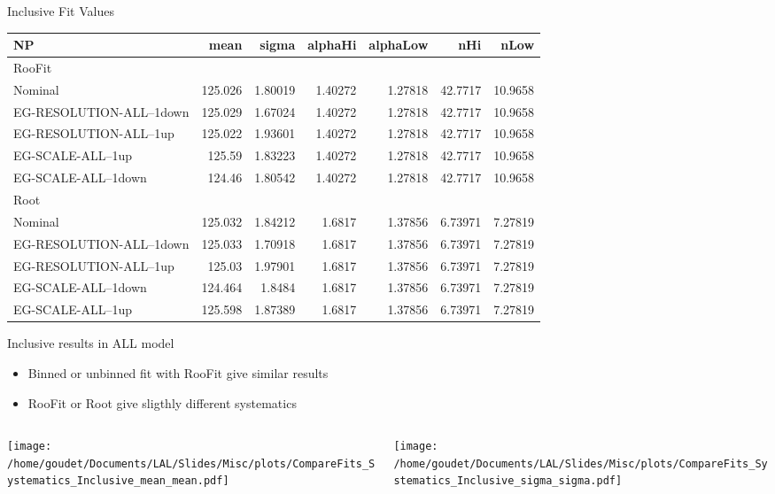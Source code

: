 \documentclass[bigger]{beamer}
\begin{document}
\begin{frame}[label={sec:org164a9b8}]{Inclusive Fit Values}
\begin{center}
\tiny
\begin{tabular}{lrrrrrr}
\hline
NP & mean & sigma & alphaHi & alphaLow & nHi & nLow\\
\hline
\hline
RooFit &  &  &  &  &  & \\
\hline
Nominal & 125.026 & 1.80019 & 1.40272 & 1.27818 & 42.7717 & 10.9658\\
EG-RESOLUTION-ALL--1down & 125.029 & 1.67024 & 1.40272 & 1.27818 & 42.7717 & 10.9658\\
EG-RESOLUTION-ALL--1up & 125.022 & 1.93601 & 1.40272 & 1.27818 & 42.7717 & 10.9658\\
EG-SCALE-ALL--1up & 125.59 & 1.83223 & 1.40272 & 1.27818 & 42.7717 & 10.9658\\
EG-SCALE-ALL--1down & 124.46 & 1.80542 & 1.40272 & 1.27818 & 42.7717 & 10.9658\\
\hline
\hline
Root &  &  &  &  &  & \\
\hline
Nominal & 125.032 & 1.84212 & 1.6817 & 1.37856 & 6.73971 & 7.27819\\
EG-RESOLUTION-ALL--1down & 125.033 & 1.70918 & 1.6817 & 1.37856 & 6.73971 & 7.27819\\
EG-RESOLUTION-ALL--1up & 125.03 & 1.97901 & 1.6817 & 1.37856 & 6.73971 & 7.27819\\
EG-SCALE-ALL--1down & 124.464 & 1.8484 & 1.6817 & 1.37856 & 6.73971 & 7.27819\\
EG-SCALE-ALL--1up & 125.598 & 1.87389 & 1.6817 & 1.37856 & 6.73971 & 7.27819\\
\hline
\end{tabular}
\end{center}
\end{frame}
\begin{frame}[label={sec:org1da5e7c}]{Inclusive results in ALL model}
\begin{itemize}
\item Binned or unbinned fit with RooFit give similar results
\item RooFit or Root give sligthly different systematics
\end{itemize}

\begin{columns}
\begin{column}{0.5\columnwidth}
\begin{center}
\texttt{[image: /home/goudet/Documents/LAL/Slides/Misc/plots/CompareFits\_Systematics\_Inclusive\_mean\_mean.pdf]}
\end{center}
\end{column}

\begin{column}{0.5\columnwidth}
\begin{center}
\texttt{[image: /home/goudet/Documents/LAL/Slides/Misc/plots/CompareFits\_Systematics\_Inclusive\_sigma\_sigma.pdf]}
\end{center}
\end{column}
\end{columns}
\end{frame}
\end{document}
